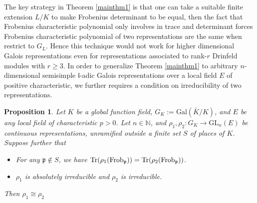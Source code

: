 \documentclass[20pt, oneside]{article}   	%
\newtheorem{prop}[thm]{Proposition}
\theoremstyle{definition}
\newcommand{\fl}{\mathfrak{l}}
\newcommand{\fp}{\mathfrak{p}}
\newcommand{\Gal}{\mathrm{Gal}}
\newcommand{\GL}{\mathrm{GL}}
\begin{document}
The key strategy in Theorem \ref{mainthm1} is that one can take a suitable finite extension $L/K$ to make Frobenius determinant to be equal, then the fact that Frobenius characteristic polynomial only involves in trace and determinant forces Frobenius characteristic polynomial of two representations are the same when restrict to $G_L$. Hence this technique would not work for higher dimensional Galois representations even for representations associated to rank-$r$ Drinfeld modules with $r\geqslant 3$. In order to generalize Theorem \ref{mainthm1} to arbitrary $n$-dimensional semisimple $\fl$-adic Galois representations over a local field $E$ of positive characteristic, we further requires a condition on irreducibility of two representations.


\begin{prop}\label{Main1}
Let $K$ be a global function field, $G_K:=\Gal(\bar{K}/K)$, and $E$ be any local field of characteristic $p>0$. Let $n\in \mathbb{N}$, and $\rho_1, \rho_2:G_K\rightarrow \GL_n(E)$ be continuous representations, unramified outside a finite set $S$ of places of $K$. Suppose further that
\begin{itemize}
\item For any $ \fp\not\in S$, we have ${\rm Tr}(\rho_1({\rm Frob}_\fp))={\rm Tr}(\rho_2({\rm Frob}_\fp))$.
\item $\rho_1$ is absolutely irreducible and $\rho_2$ is irreducible.
\end{itemize}
Then $\rho_1\cong\rho_2$
\end{prop}
\end{document}
